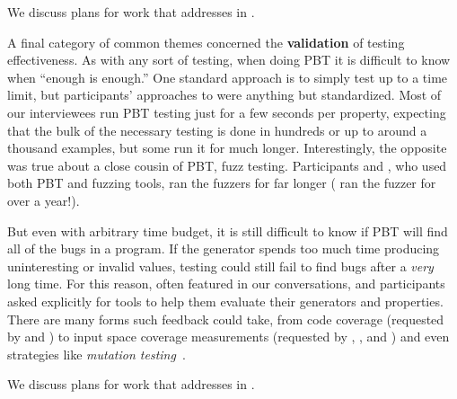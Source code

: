 We discuss plans for work that addresses  in .

\smallskip

A final category of common themes concerned the {\bf validation} of testing
effectiveness. As with any sort of testing, when doing PBT it is difficult to
know when ``enough is enough.'' One standard approach is to simply test up to a
time limit, but participants' approaches to 
were anything but standardized.
Most of our interviewees run PBT testing just for a few seconds per property,
expecting that the bulk of the necessary testing is done in hundreds or up to
around a thousand examples, but some run it for much longer.
Interestingly, the opposite was true about a close cousin of PBT, fuzz testing.
Participants  and , who used both PBT and
fuzzing tools, ran the fuzzers for far longer
( ran the fuzzer for over a year!).

But even with arbitrary time budget, it is still difficult to know if PBT will
find all of the bugs in a program. If the generator spends too much time
producing uninteresting or invalid values, testing could still fail to find bugs
after a {\em very} long time.
For this reason,  often featured in our
conversations, and participants asked explicitly for tools to help them evaluate
their generators and properties.
There are many forms such feedback could take, from code coverage (requested by
 and ) to input space coverage measurements
(requested by , , and ) and even
strategies like {\em mutation
  testing}~\cite{papadakis_mutation_2018}.

We discuss plans for work that addresses
 in .


\iflater
{}
\fi

